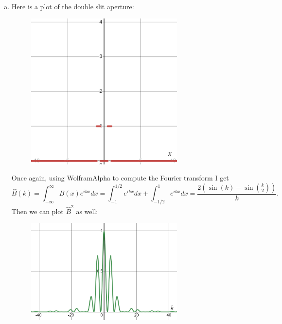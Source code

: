 \documentclass[12pt]{article} %
\begin{document}
\begin{solution}
\begin{enumerate}[(a)]
\item Here is a plot of the double slit aperture:
\begin{figure}[H]
	\centering
	\includegraphics[width=0.75\textwidth]{double_slit_aperture.png}
\end{figure}

Once again, using WolframAlpha to compute the Fourier transform I get
	\[
	\hat{B}(k) = \int_{-\infty}^\infty B(x) e^{ikx}dx = \int_{-1}^{1/2} e^{ikx}dx + \int_{-1/2}^{1} e^{ikx}dx = \frac{2\left(\sin(k)-\sin \left(\frac{k}{2}\right)\right)}{k}.
	\]
Then we can plot $\hat{B}^2$ as well:
\begin{figure}[H]
	\centering
	\includegraphics[width=0.75\textwidth]{double_slit_pattern.png}
\end{figure}


\end{enumerate}
\end{solution}
\end{document}
